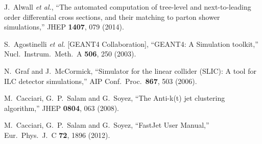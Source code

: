 \documentclass{PoS}
\begin{document}
\begin{thebibliography}{99}
  J.~Alwall {\it et al.},
  ``The automated computation of tree-level and next-to-leading order differential cross sections, and their matching to parton shower simulations,''
  JHEP {\bf 1407}, 079 (2014).




  S.~Agostinelli {\it et al.} [GEANT4 Collaboration],
  ``GEANT4: A Simulation toolkit,''
  Nucl.\ Instrum.\ Meth.\ A {\bf 506}, 250 (2003).

  N.~Graf and J.~McCormick,
  ``Simulator for the linear collider (SLIC): A tool for ILC detector simulations,''
  AIP Conf.\ Proc.\  {\bf 867}, 503 (2006).

  M.~Cacciari, G.~P.~Salam and G.~Soyez,
  ``The Anti-k(t) jet clustering algorithm,''
  JHEP {\bf 0804}, 063 (2008).


  M.~Cacciari, G.~P.~Salam and G.~Soyez,
  ``FastJet User Manual,''
  Eur.\ Phys.\ J.\ C {\bf 72}, 1896 (2012).

\end{thebibliography}
\end{document}
